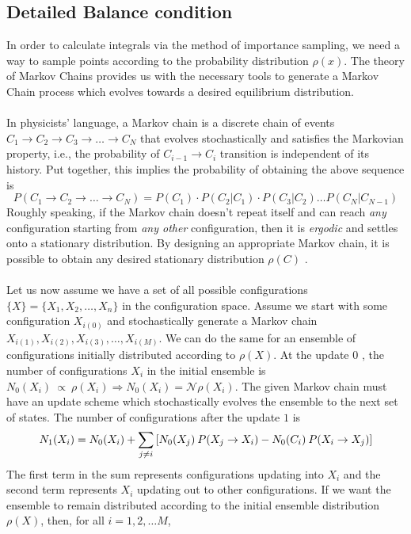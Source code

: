 \documentclass[../thesis_main.tex]{subfiles}
\begin{document}
\subsection{Detailed Balance condition}
In order to calculate integrals via the method of importance sampling, we need a way to sample points according to the probability distribution $\rho(x)$. The theory of Markov Chains provides us with the necessary tools to generate a Markov Chain process which evolves towards a desired equilibrium distribution.~\\~\\
In physicists' language, a Markov chain is a discrete chain of events $C_1 \to C_2 \to C_3 \to \ldots \to C_N$ that evolves stochastically and satisfies the Markovian property, i.e., the probability of $C_{i-1} \to C_i$ transition is independent of its history. Put together, this implies the probability of obtaining the above sequence is
\begin{equation}
    P(C_1 \to C_2 \to\ldots \to C_N) = P(C_1)\cdot P(C_2 | C_1) \cdot P(C_3 | C_2) \ldots P(C_N | C_{N-1})
\end{equation}
Roughly speaking, if the Markov chain doesn't repeat itself and can reach \textit{any}  configuration starting from \textit{any other}  configuration, then it is \textit{ergodic} and settles onto a stationary distribution. By designing an appropriate Markov chain, it is possible to obtain any desired stationary distribution $\rho(C)$ .~\\~\\
Let us now assume we have a set of all possible configurations $\{X\} = \{X_1, X_2, \ldots, X_n\}$ in the configuration space. Assume we start with some configuration $X_{i(0)}$ and stochastically generate a Markov chain $X_{i(1)}, X_{i(2)}, X_{i(3)}, \ldots, X_{i(M)}$. We can do the same for an ensemble of configurations initially distributed according to $\rho(X)$. At the update $0$ , the number of configurations $X_i$ in the initial ensemble is $N_0(X_i) \: \propto \: \rho(X_i) \Rightarrow N_0 (X_i) = \mathcal{N} \rho(X_i)$. The given Markov chain must have an update scheme which stochastically evolves the ensemble to the next set of states. The number of configurations after the update $1$ is
\begin{equation}
    N_1(X_i) = N_0(X_i) + \sum_{j\neq i} \qty[N_0(X_j) \: P(X_j \to X_i) - N_0(C_i) \: P(X_i \to X_j)]
    \label{master}
\end{equation}
The first term in the sum represents configurations updating into $X_i$ and the second term represents $X_i$ updating out to other configurations. If we want the ensemble to remain distributed according to the initial ensemble distribution $\rho(X)$, then, for all $i = 1, 2, \ldots M$,
\end{document}
